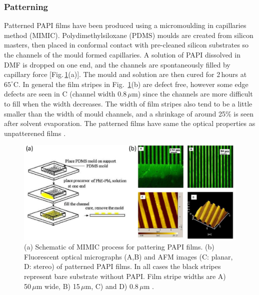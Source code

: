 \subsubsection{Patterning}
Patterned PAPI films have been produced using a micromoulding in capillaries method (MIMIC). Polydimethylsiloxane (PDMS) moulds are created from silicon masters, then placed in conformal contact with pre-cleaned silicon substrates so the channels of the mould formed capillaries. A solution of PAPI dissolved in DMF is dropped on one end, and the channels are spontaneously filled by capillary force [Fig.\,\ref{2Fig11}(a)]. The mould and solution are then cured for 2\,hours at $65^{\circ}$C. In general the film stripes in Fig.\ \ref{2Fig11}(b) are defect free, however some edge defects are seen in C (channel width 0.8\,$\mu$m) since the channels are more difficult to fill when the width decreases. The width of film stripes also tend to be a little smaller than the width of mould channels, and a shrinkage of around 25\% is seen after solvent evaporation.  The patterned films have same the optical properties as unpatterened films \cite{Cheng2003}.
\begin{figure} [h!]
\centering
\includegraphics[width=\textwidth]{Fig11}
\caption{(a) Schematic of MIMIC process for pattering PAPI films. (b) Fluorescent optical micrographs (A,B) and AFM images (C: planar, D: stereo) of patterned PAPI films. In all cases the black stripes represent bare substrate without PAPI. Film stripe widths are A) 50\,$\mu$m wide, B) 15\,$\mu$m, C) and D) 0.8\,$\mu$m \cite{Cheng2003}.}
\label{2Fig11}
\end{figure}


